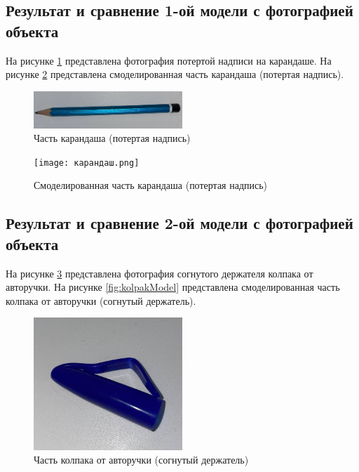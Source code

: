 \documentclass[areasetadvanced]{scrartcl}
\begin{document}
\subsection{Результат и сравнение 1-ой модели с фотографией объекта}
На рисунке \ref{fig:pencilName} представлена фотография потертой надписи на карандаше.
На рисунке \ref{fig:pencilModel} представлена смоделированная часть карандаша (потертая надпись).

\begin{figure}[H]
    \centering
    \includegraphics[width=0.5\textwidth]{PencilName.png}
    \caption{Часть карандаша (потертая надпись)}
    \label{fig:pencilName}
\end{figure}

\begin{figure}[H]
    \centering
    \texttt{[image: карандаш.png]}
    \caption{Смоделированная часть карандаша (потертая надпись)}
    \label{fig:pencilModel}
\end{figure}

\subsection{Результат и сравнение 2-ой модели с фотографией объекта}
На рисунке \ref{fig:kolpakName} представлена фотография согнутого держателя колпака от авторучки.
На рисунке \ref{fig:kolpakModel} представлена смоделированная часть колпака от авторучки (согнутый держатель).

\begin{figure}[H]
    \centering
    \includegraphics[width=0.5\textwidth]{kolpak_org.png}
    \caption{Часть колпака от авторучки (согнутый держатель)}
    \label{fig:kolpakName}
\end{figure}
\end{document}
